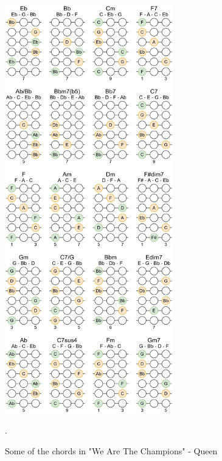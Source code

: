 \begin{figure}[h]
	\centering
	\includegraphics[width=0.65\textwidth]{../../Images/WeAreTheChampionsQueenKeyChangeChords.png}
	\caption{Some of the chords in "We Are The Champions" - Queen}.
	\label{fig:queen_we_are_the_champions_key_change_chords}
\end{figure}


\newpage